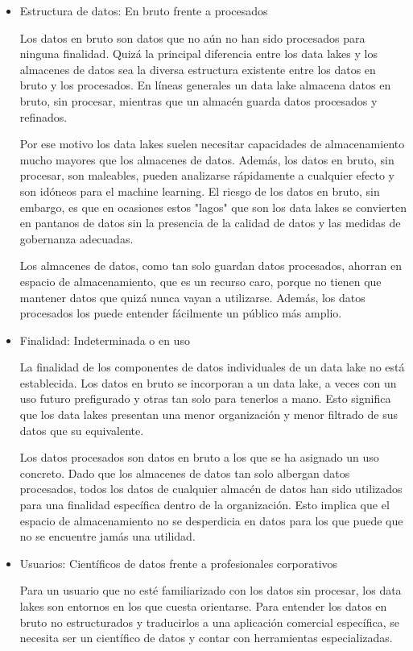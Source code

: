 \documentclass[preprint,12pt]{elsarticle}
\begin{document}
\begin{itemize}

\item Estructura de datos: En bruto frente a procesados

Los datos en bruto son datos que no aún no han sido procesados para ninguna finalidad. Quizá la principal diferencia entre los data lakes y los almacenes de datos sea la diversa estructura existente entre los datos en bruto y los procesados. En líneas generales un data lake almacena datos en bruto, sin procesar, mientras que un almacén guarda datos procesados y refinados.

Por ese motivo los data lakes suelen necesitar capacidades de almacenamiento mucho mayores que los almacenes de datos. Además, los datos en bruto, sin procesar, son maleables, pueden analizarse rápidamente a cualquier efecto y son idóneos para el machine learning. El riesgo de los datos en bruto, sin embargo, es que en ocasiones estos "lagos" que son los data lakes se convierten en pantanos de datos sin la presencia de la calidad de datos y las medidas de gobernanza adecuadas.

Los almacenes de datos, como tan solo guardan datos procesados, ahorran en espacio de almacenamiento, que es un recurso caro, porque no tienen que mantener datos que quizá nunca vayan a utilizarse. Además, los datos procesados los puede entender fácilmente un público más amplio.

\item Finalidad: Indeterminada o en uso

La finalidad de los componentes de datos individuales de un data lake no está establecida. Los datos en bruto se incorporan a un data lake, a veces con un uso futuro prefigurado y otras tan solo para tenerlos a mano. Esto significa que los data lakes presentan una menor organización y menor filtrado de sus datos que su equivalente.

Los datos procesados son datos en bruto a los que se ha asignado un uso concreto. Dado que los almacenes de datos tan solo albergan datos procesados, todos los datos de cualquier almacén de datos han sido utilizados para una finalidad específica dentro de la organización. Esto implica que el espacio de almacenamiento no se desperdicia en datos para los que puede que no se encuentre jamás una utilidad.

\item Usuarios: Científicos de datos frente a profesionales corporativos

Para un usuario que no esté familiarizado con los datos sin procesar, los data lakes son entornos en los que cuesta orientarse. Para entender los datos en bruto no estructurados y traducirlos a una aplicación comercial específica, se necesita ser un científico de datos y contar con herramientas especializadas.


\end{itemize}
\end{document}
